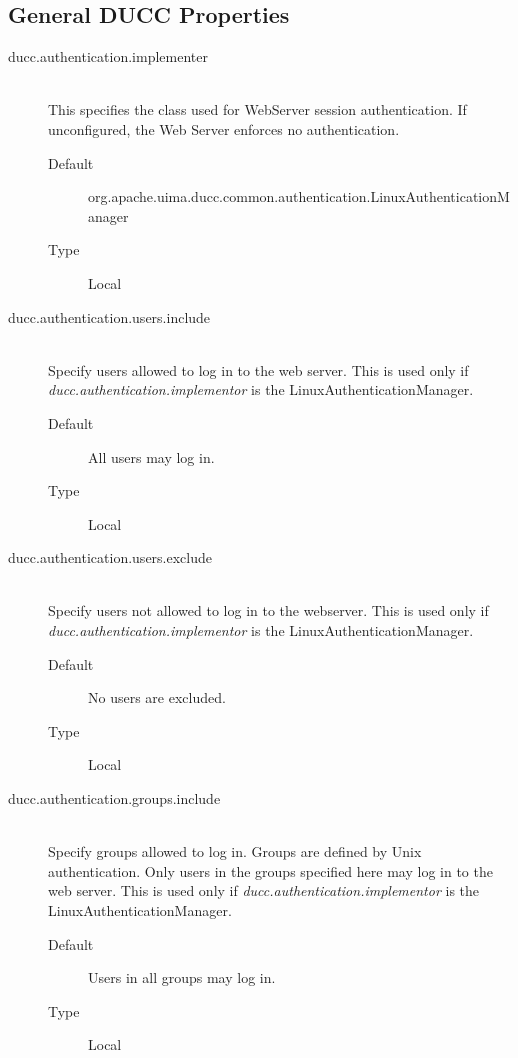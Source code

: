 \subsection{General DUCC Properties}
    \begin{description}

       \item[ducc.authentication.implementer] \hfill \\
         This specifies the class used for WebServer session authentication.  If unconfigured,
         the Web Server enforces no authentication.
         \begin{description}
           \item[Default] org.apache.uima.ducc.common.authentication.LinuxAuthenticationManager
           \item[Type] Local
         \end{description}

       \item[ducc.authentication.users.include] \hfill \\
          Specify users allowed to log in to the web server.  This is used only
          if {\em ducc.authentication.implementor} is the LinuxAuthenticationManager.
         \begin{description}
           \item[Default] All users may log in.
           \item[Type] Local
         \end{description}

       \item[ducc.authentication.users.exclude] \hfill \\
          Specify users not allowed to log in to the webserver.  This is used only
          if {\em ducc.authentication.implementor} is the LinuxAuthenticationManager.
         \begin{description}
           \item[Default] No users are excluded.
           \item[Type] Local
         \end{description}

       \item[ducc.authentication.groups.include] \hfill \\
         Specify groups allowed to log in.  Groups are defined by Unix authentication.  Only
         users in the groups specified here may log in to the web server.  This is used only
          if {\em ducc.authentication.implementor} is the LinuxAuthenticationManager.
         \begin{description}
           \item[Default] Users in all groups may log in.
           \item[Type] Local
         \end{description}


\end{description}
